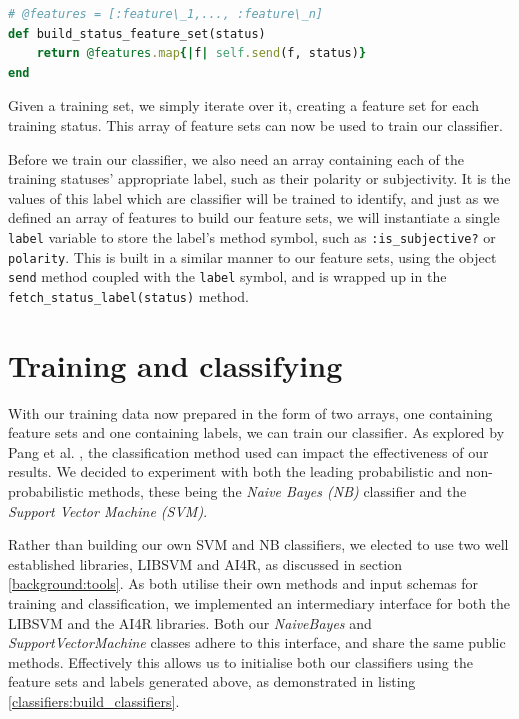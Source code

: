 \begin{lstlisting}[language=Ruby, caption={Method for building a status' feature set}, label=classifiers:status_feature_set]
# @features = [:feature\_1,..., :feature\_n]
def build_status_feature_set(status)
	return @features.map{|f| self.send(f, status)}
end
\end{lstlisting}

Given a training set, we simply iterate over it, creating a feature set for each training status. This array of feature sets can now be used to train our classifier.

Before we train our classifier, we also need an array containing each of the training statuses' appropriate label, such as their polarity or subjectivity. It is the values of this label which are classifier will be trained to identify, and just as we defined an array of features to build our feature sets, we will instantiate a single \texttt{label} variable to store the label's method symbol, such as \texttt{:is\_subjective?} or \texttt{polarity}. This is built in a similar manner to our feature sets, using the object \texttt{send} method coupled with the \texttt{label} symbol, and is wrapped up in the \texttt{fetch\-\_status\-\_label\-(status)} method.

\section{Training and classifying}

With our training data now prepared in the form of two arrays, one containing feature sets and one containing labels, we can train our classifier. As explored by Pang et al. \cite{Pang:2008wj}, the classification method used can impact the effectiveness of our results. We decided to experiment with both the leading probabilistic and non-probabilistic methods, these being the \emph{Naive Bayes (NB)} classifier and the \emph{Support Vector Machine (SVM)}. 

Rather than building our own SVM and NB classifiers, we elected to use two well established libraries, LIBSVM and AI4R, as discussed in section \ref{background:tools}. As both utilise their own methods and input schemas for training and classification, we implemented an intermediary interface for both the LIBSVM and the AI4R libraries. Both our \emph{NaiveBayes} and \emph{SupportVectorMachine} classes adhere to this interface, and share the same public methods. Effectively this allows us to initialise both our classifiers using the feature sets and labels generated above, as demonstrated in listing \ref{classifiers:build_classifiers}. 

